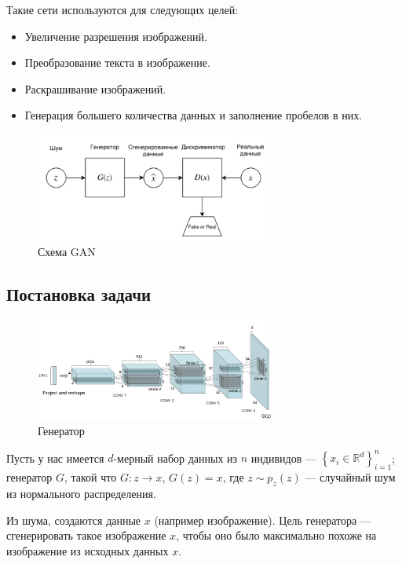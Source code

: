 \documentclass{article}
\theoremstyle{definition}
\theoremstyle{theorem}
\theoremstyle{remark}
\theoremstyle{theorem}
\theoremstyle{example}
\theoremstyle{theorem}
\theoremstyle{theorem}
\theoremstyle{theorem}
\theoremstyle{theorem}
\begin{document}
Такие сети используются для следующих целей:

\begin{itemize}
	\item Увеличение разрешения изображений.
	\item Преобразование текста в изображение.
	\item Раскрашивание изображений.
	\item Генерация большего количества данных и заполнение пробелов в них.
\end{itemize}

\begin{figure}[!ht]
	\centering
	\includegraphics[width=0.7\textwidth]{img/gan_1.png}
	\caption{Схема GAN}
	\label{fig:gan_scheme}
\end{figure}





\subsection{Постановка задачи}

	\begin{figure}[!ht]
	\centering
	\includegraphics[width=0.7\textwidth]{img/generator.png}
	\caption {Генератор}
	\label{fig:generator}
	\end{figure}

	
	Пусть у нас имеется $d$-мерный набор данных из $n$ индивидов --- $\left\{x_i \in \mathbb{R}^d\right\}_{i=1}^n$; генератор $G$, такой что $G:z \rightarrow x$, $G(z) = x$, где $z\sim p_z(z)$ --- случайный шум из нормального распределения.
	
	Из шума, создаются данные $x$ (например изображение). Цель генератора --- сгенерировать такое изображение $x$, чтобы оно было максимально похоже на изображение из исходных данных $x$.
	
\end{document}
